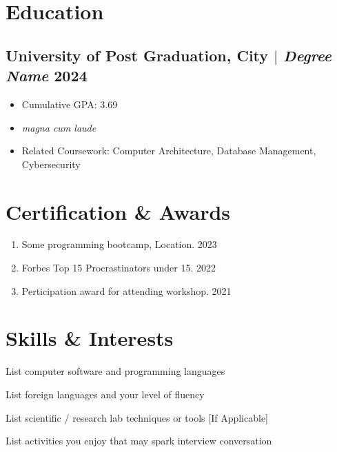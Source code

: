 \documentclass[11pt]{article} %
\begin{document}
\section{Education}
\subsection{University of Post Graduation, City $|$ {\normalfont\itshape Degree Name} \hfill 2024}
\begin{itemize}
        \item Cumulative GPA: 3.69
        \item \textit{magna cum laude} 
  \item Related Coursework: Computer Architecture, Database Management, Cybersecurity
\end{itemize}


\section{Certification \& Awards}
\begin{enumerate}[label=\null, left=0pt..0pt, itemsep=0pt]
        \item Some programming bootcamp, Location. \hfill 2023
        \item Forbes Top 15 Procrastinators under 15. \hfill 2022
        \item Perticipation award for attending workshop. \hfill 2021
\end{enumerate}

\section{Skills \& Interests}
\begin{description}[itemsep=0pt]
        \item[Technical] List computer software and programming languages
        \item[Language] List foreign languages and your level of fluency
        \item[Laboratory] List scientific / research lab techniques or tools [If Applicable]
        \item[Interests] List activities you enjoy that may spark interview conversation
\end{description}
\end{document}
